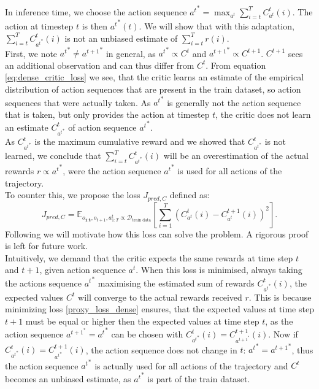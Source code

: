 In inference time, we choose the action sequence 
${a^t}^* = \max_{a^t} \sum_{i=t}^T C_{a^t}^t(i)$. The action at timestep $t$ is then ${a^t}^*(t)$. We will show that with this adaptation, $\sum_{i=t}^T C_{{a^t}^*}^t(i)$ is not an unbiased estimate of 
$\sum_{i=t}^T r(i)$.\\

First, we note ${a^t}^* \neq {a^{t+1}}^*$ in general, as ${a^t}^* \propto C^t$ and ${a^{t+1}}^* \propto C^{t+1}$. $C^{t+1}$ sees an additional observation and can thus differ from $C^{t}$. 
From equation \ref{eq:dense_critic_loss} we see, that the critic learns an estimate of the empirical distribution of action sequences that are present in the train dataset, so action sequences that 
were actually taken. As ${a^t}^*$ is generally not the action sequence that is taken, but only provides the action at timestep $t$, the critic does not learn an estimate $C_{{a^t}^*}^t$ of action sequence 
${a^t}^*$. \\

As $C_{{a^t}^*}^t$ is the maximum cumulative reward and we showed that $C_{{a^t}^*}^t$ is not learned, we conclude that $\sum_{i=t}^T C_{{a^t}^*}^t(i)$ 
will be an overestimation of the actual rewards $r \propto {a^t}^*$, were the action sequence ${a^t}^*$ is used for all actions of the trajectory. \\

To counter this, we propose the loss $J_{pred, C}$ defined as:
\begin{equation}
    \label{proxy_loss_dense}
    J_{pred, C} = \mathbb{E}_{o_{\textbf{1:t}} , o_{t+1}, a^t_{1:T} \propto \mathcal{D}_{\text{train data}}}\left[ \sum_{i=1}^T(C_{{a^t}}^t(i) - C_{{a^t}}^{t+1}(i))^2 \right].
\end{equation}
Following we will motivate how this loss can solve the problem. A rigorous proof 
is left for future work.\\

Intuitively, we demand that the critic expects the same rewards at time step $t$ and $t+1$, given action sequence $a^t$. When this loss is minimised, always taking the actions sequence ${a^t}^*$ maximising the estimated sum of 
rewards $C_{{a^t}^*}^t(i)$, 
the expected values $C^t$ will converge to the actual rewards received $r$. This is because minimizing loss \ref{proxy_loss_dense} ensures, that the expected 
values at time step $t+1$ must be equal or higher then the expected values at time step $t$, as the action sequence $a^{t+1}^* = {a^t}^*$ can be chosen with 
$C_{{a^t}^*}^t(i) = C_{a^{t+1}^*}^{t+1}(i)$. Now if $C_{{a^t}^*}^t(i) = C_{{a^t}^*}^{t+1}(i)$, the action sequence does not change in $t$: ${a^t}^* = {a^{t+1}}^*$, thus the action 
sequence ${a^t}^*$ is actually used for all actions of the trajectory and $C^t$ becomes an unbiased estimate, as ${a^t}^*$ is part of the train dataset. \\

